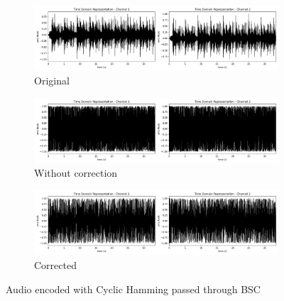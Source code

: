 \documentclass{article}
\begin{document}
\begin{figure}[htb]
    \centering
    \begin{subfigure}[b]{\textwidth}
        \centering
        \includegraphics[width=\textwidth]{../Result/wav-time-domain-TX.png}
        \caption{Original}
        \label{fig:t-audio-cyclic-bsc-original}
    \end{subfigure}
    \begin{subfigure}[b]{\textwidth}
        \centering
        \includegraphics[width=\textwidth]{../Result/cyclic-bsc-wav-time-domain-RX.png}
        \caption{Without correction}
        \label{fig:t-audio-cyclic-bsc-no-correction}
    \end{subfigure}
    \begin{subfigure}[b]{\textwidth}
        \centering
        \includegraphics[width=\textwidth]{../Result/cyclic-bsc-wav-time-domain-RX-syndrome-corrected.png}
        \caption{Corrected}
        \label{fig:t-audio-cyclic-bsc-syndrome-syndrome-corrected}
    \end{subfigure}
       \caption{Audio encoded with Cyclic Hamming passed through BSC}
       \label{fig:t-audio-cyclic-bsc}
\end{figure}
\end{document}
